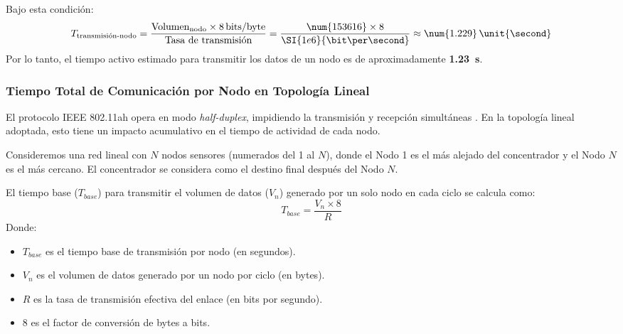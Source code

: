 Bajo esta condición:
\[
T_{\text{transmisión-nodo}} = \frac{\text{Volumen}_{\text{nodo}} \times 8\,\text{bits/byte}}{\text{Tasa de transmisión}} = \frac{\num{153616} \times 8}{\SI{1e6}{\bit\per\second}} \approx \num{1.229}\,\unit{\second}
\]
Por lo tanto, el tiempo activo estimado para transmitir los datos de un nodo es de aproximadamente \textbf{\SI{1.23}{\second}}.


\subsubsection{Tiempo Total de Comunicación por Nodo en Topología Lineal}
\label{ssubsec:tiempo_general_comm}

El protocolo IEEE 802.11ah opera en modo \textit{half-duplex}, impidiendo la transmisión y recepción simultáneas \cite{ieee80211ah}. En la topología lineal adoptada, esto tiene un impacto acumulativo en el tiempo de actividad de cada nodo.

Consideremos una red lineal con $N$ nodos sensores (numerados del 1 al $N$), donde el Nodo 1 es el más alejado del concentrador y el Nodo $N$ es el más cercano. El concentrador se considera como el destino final después del Nodo $N$.

El tiempo base ($T_{base}$) para transmitir el volumen de datos ($V_n$) generado por un solo nodo en cada ciclo se calcula como:
\begin{equation} \label{eq:tiempo_base}
T_{base} = \frac{V_n \times 8}{R}
\end{equation}
Donde:
\begin{itemize}
    \item $T_{base}$ es el tiempo base de transmisión por nodo (en segundos).
    \item $V_n$ es el volumen de datos generado por un nodo por ciclo (en bytes).
    \item $R$ es la tasa de transmisión efectiva del enlace (en bits por segundo).
    \item 8 es el factor de conversión de bytes a bits.
\end{itemize}

